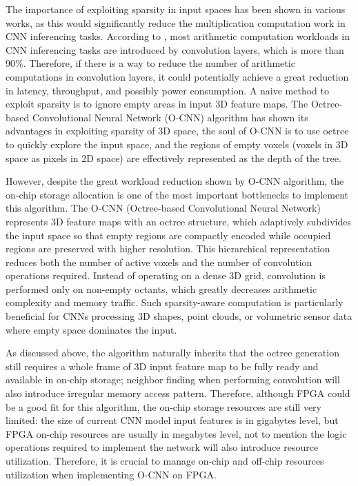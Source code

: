 \documentclass[sigconf, screen]{acmart}
\begin{document}
The importance of exploiting sparsity in input spaces has been shown in various works\cite{sparsity}, as this would significantly reduce the multiplication computation work in CNN inferencing tasks. According to \cite{CNNWorkloadMainSource}, most arithmetic computation workloads in CNN inferencing tasks are introduced by convolution layers, which is more than 90\%. Therefore, if there is a way to reduce the number of arithmetic computations in convolution layers, it could potentially achieve a great reduction in latency, throughput, and possibly power consumption. A naive method to exploit sparsity is to ignore empty areas in input 3D feature maps. The Octree-based Convolutional Neural Network (O-CNN) algorithm has shown its advantages in exploiting sparsity of 3D space\cite{ocnnoriginal}, the soul of O-CNN is to use octree to quickly explore the input space, and the regions of empty voxels (voxels in 3D space as pixels in 2D space) are effectively represented as the depth of the tree.

However, despite the great workload reduction shown by O-CNN algorithm, the on-chip storage allocation is one of the most important bottlenecks to implement this algorithm. The O-CNN (Octree-based Convolutional Neural Network) represents 3D feature maps with an octree structure, which adaptively subdivides the input space so that empty regions are compactly encoded while occupied regions are preserved with higher resolution. This hierarchical representation reduces both the number of active voxels and the number of convolution operations required. Instead of operating on a dense 3D grid, convolution is performed only on non-empty octants, which greatly decreases arithmetic complexity and memory traffic. Such sparsity-aware computation is particularly beneficial for CNNs processing 3D shapes, point clouds, or volumetric sensor data where empty space dominates the input. 

As discussed above, the algorithm naturally inherits that the octree generation still requires a whole frame of 3D input feature map to be fully ready and available in on-chip storage; neighbor finding when performing convolution will also introduce irregular memory access pattern. Therefore, although FPGA could be a good fit for this algorithm, the on-chip storage resources are still very limited: the size of current CNN model input features is in gigabytes level, but FPGA on-chip resources are usually in megabytes level\cite{amddatasheet}, not to mention the logic operations required to implement the network will also introduce resource utilization. Therefore, it is crucial to manage on-chip and off-chip resources utilization when implementing O-CNN on FPGA.
\end{document}
